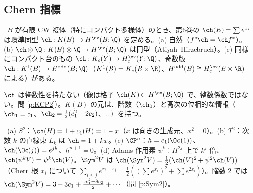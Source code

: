 \subsection{Chern 指標}
\begin{thm}[Chern 指標]\label{thm:ch}\tC\
$B$ が有限 CW 複体（特にコンパクト多様体）のとき、第6巻の $\ch(E)=\sum e^{x_i}$ は環準同型 $\ch:K(B)\to H^{\ev}(B;\Q)$ を定める。(a) 自然（$f^*\ch=\ch f^*$）。(b) $\ch\otimes\Q:K(B)\otimes\Q\to H^{\ev}(B;\Q)$ は同型（Atiyah--Hirzebruch）。(c) 同様にコンパクト台のもの $\ch:K_c(Y)\to H^{\ev}_c(Y;\Q)$、奇数版 $\ch:K^1(B)\to H^{\rm odd}(B;\Q)$（$K^1(B)=K_c(B\times\R)$、$H^{\rm odd}(B)\cong H_c^{\ev}(B\times\R)$ による）がある。
\end{thm}
$\ch$ は整数性を持たない（像は格子 $\ch(K)\subset H^{\ev}(B;\Q)$ で、整数係数ではない。問 \ref{p:KCP2}）。$K(B)$ の元は、階数（$\ch_0$）と高次の位相的な情報（$\ch_1=c_1$、$\ch_2=\frac12(c_1^2-2c_2)$、$\dots$）を持つ。
\begin{ex}[基本的な $\ch$]\label{ex:chbasic}\tP\
(a) $S^2$：$\ch(H)=1+c_1(H)=1-x$（$x$ は向きの生成元、$x^2=0$）。(b) $T^2$：次数 $k$ の直線束 $L_k$ は $\ch=1+kx$。(c) $\CP^n$：$h=c_1(\Oc(1))$、$\ch(\Oc(j))=e^{jh}$、$h^{n+1}=0$。(d) Adams 作用素 $\psi^k$：$H^{2j}$ 上で $k^j$ 倍、$\ch(\psi^kV)=\psi^k\ch(V)$。$\Sym^2V$ は $\ch(\Sym^2V)=\frac12\bigl(\ch(V)^2+\psi^2\ch(V)\bigr)$（Chern 根 $x_i$ について $\sum_{i\le j}e^{x_i+x_j}=\frac12((\sum e^{x_i})^2+\sum e^{2x_i})$）。階数 2 では $\ch(\Sym^2V)=3+3c_1+\frac{5c_1^2-8c_2}2+\cdots$（問 \ref{p:Sym2}）。
\end{ex}

